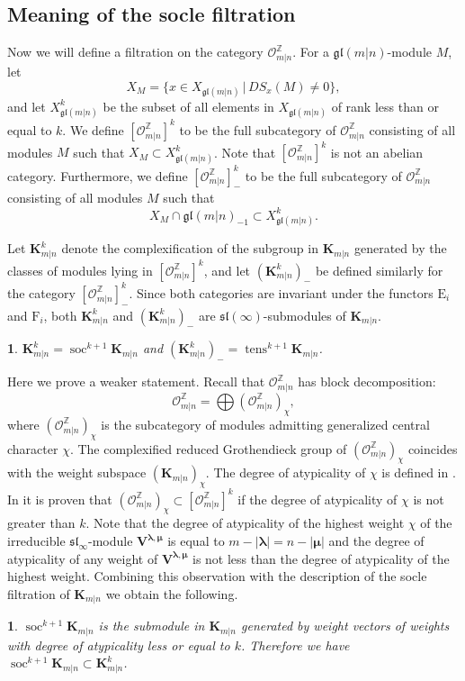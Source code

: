 \documentclass[12pt,oneside,english]{amsart}
\numberwithin{equation}{section}
\numberwithin{figure}{section}
\theoremstyle{plain}
\theoremstyle{plain}
\theoremstyle{remark}
\theoremstyle{definition}
\theoremstyle{plain}
\newtheorem{conjecture}[thm]{\protect\conjecturename}
\theoremstyle{remark}
\theoremstyle{definition}
\theoremstyle{plain}
\theoremstyle{plain}
\newtheorem{prop}[thm]{\protect\propositionname}
\theoremstyle{definition}
\providecommand{\conjecturename}{Conjecture}
\providecommand{\propositionname}{Proposition}
\newcommand{\bV}{\mathbf{V}}
\newcommand{\bK}{\mathbf{K}}
\newcommand{\soc}{\operatorname{soc}}
\newcommand{\tens}{\operatorname{tens}}
\begin{document}
\subsection{Meaning of the socle filtration}
Now we will define a filtration on the category $\mathcal O_{m|n}^{\mathbb Z}$.
For a $\mathfrak {gl}(m|n)$-module $M$, let
$$X_M=\{x\in X_{\mathfrak{gl}(m|n)}\,|\,DS_x(M)\neq 0\},$$
and let $X^k_{\mathfrak{gl}(m|n)}$ be the subset of all elements in $X_{\mathfrak{gl}(m|n)}$ of rank less than or equal to $k$. We define
$[\mathcal O^{\mathbb Z}_{m|n}]^k$ to be the full subcategory of $\mathcal O^{\mathbb Z}_{m|n}$ consisting  of all modules $M$ such that
$X_M\subset X^k_{\mathfrak{gl}(m|n)}$. Note that $[\mathcal O^{\mathbb Z}_{m|n}]^k$ is not an abelian category. Furthermore,
we define $[\mathcal O^{\mathbb Z}_{m|n}]_{-}^k$ to be the full subcategory of $\mathcal O^{\mathbb Z}_{m|n}$ consisting of all modules $M$ such that
$$X_M\cap\mathfrak{gl}(m|n)_{-1}\subset X^k_{\mathfrak{gl}(m|n)}.$$

Let $\bK_{m|n}^k$ denote the complexification of the subgroup in $\bK_{m|n}$ generated by the classes of modules lying in $[\mathcal O^{\mathbb Z}_{m|n}]^k$,
and let $(\bK_{m|n}^k)_-$ be defined similarly for the category $[\mathcal O^{\mathbb Z}_{m|n}]_{-}^k$.
 Since both categories are invariant under the functors $\mathrm{E}_i$ and $\mathrm{F}_i$,  both $\bK_{m|n}^k$  and $(\bK_{m|n}^k)_-$  are
$\mathfrak{sl}(\infty)$-submodules of $\bK_{m|n}$.

\begin{conjecture} $\bK_{m|n}^k=\soc^{k+1}\bK_{m|n}$ and  $(\bK_{m|n}^k)_-=\tens^{k+1}\bK_{m|n}$.
\end{conjecture}
Here we prove a weaker statement.
Recall that $\mathcal O_{m|n}^{\mathbb Z}$ has block decomposition:
$$\mathcal O_{m|n}^{\mathbb Z}=\bigoplus(\mathcal O_{m|n}^{\mathbb Z})_{\chi},$$
where $(\mathcal O_{m|n}^{\mathbb Z})_{\chi}$ is the subcategory of modules admitting generalized central character $\chi$. The complexified reduced
Grothendieck group of $(\mathcal O_{m|n}^{\mathbb Z})_{\chi}$ coincides with the weight subspace $(\bK_{m|n})_{\chi}$. The degree of atypicality of $\chi$
is defined in \cite{DS}. In \cite{CS} it is proven that $(\mathcal O_{m|n}^{\mathbb Z})_{\chi}\subset [\mathcal O^{\mathbb Z}_{m|n}]^k$ if the degree of atypicality
of $\chi$ is not greater than $k$. Note that the degree of atypicality of the highest weight $\chi$ of the irreducible $\mathfrak{sl}_{\infty}$-module $\bV^{{\boldsymbol{\lambda},{\boldsymbol{\mu}}}}$
is equal to $m-|{\boldsymbol{\lambda}}|=n-|{\boldsymbol{\mu}}|$ and the degree of atypicality of any weight of $\bV^{{\boldsymbol{\lambda},{\boldsymbol{\mu}}}}$ is not
less than the degree of atypicality of the highest weight. Combining this observation with the description of the socle filtration of $\bK_{m|n}$ we obtain
the following.
  \begin{prop} $\soc^{k+1}\bK_{m|n}$ is the submodule in $\bK_{m|n}$ generated by weight vectors of weights with degree of atypicality less or
    equal to $k$. Therefore we have $\soc^{k+1}\bK_{m|n}\subset \bK_{m|n}^k$.
    \end{prop}
\end{document}
